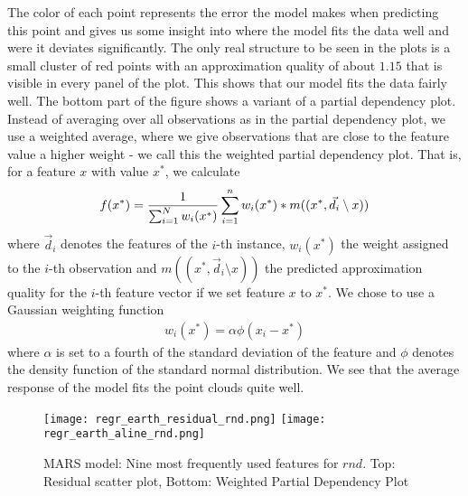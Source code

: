 \documentclass{article}
\begin{document}
The color of each point represents the error the model makes when
predicting this point and gives us some insight into where the model
fits the data well and were it deviates significantly. The only real
structure to be seen in the plots is a small cluster of red points with an
approximation quality of about $1.15$ that is visible in every panel
of the plot. This shows that our model fits the data fairly well. The
bottom part of the figure shows a variant of a partial dependency
plot. Instead of averaging over all observations as in the partial
dependency plot, we use a weighted average, where we give observations
that are close to the feature value a higher weight - we call this the
weighted partial dependency plot. That is, for a feature $x$ with
value $x^*$, we calculate
\begin{displaymath}
  f(x^*) = \frac{1}{\sum_{i=1}^N w_i(x^*)}
  \sum_{i=1}^n w_i(x^*) * m((x^*, \vec d_i \setminus x)) \\
\end{displaymath}
where $\vec d_i$ denotes the features of the $i$-th instance,
$w_i(x^*)$ the weight assigned to the $i$-th observation and $m((x^*,
\vec d_i \setminus x))$ the predicted approximation quality for the
$i$-th feature vector if we set feature $x$ to $x^*$. We chose to use a
Gaussian weighting function
\begin{align*}
  w_i(x^*) = \alpha \phi(x_i - x^*)
\end{align*}
where $\alpha$ is set to a fourth of the standard deviation of the
feature and $\phi$ denotes the density function of the standard normal distribution. We see that the average response of the model fits the point
clouds quite well.

\begin{figure}
  \centering
  \texttt{[image: regr\_earth\_residual\_rnd.png]}\vspace*{0.2cm}
  \texttt{[image: regr\_earth\_aline\_rnd.png]}
  \caption{MARS model: Nine most frequently used features for
    $rnd$. Top: Residual scatter plot, Bottom: Weighted Partial
    Dependency Plot}
  \label{fig:MARS}
\end{figure}
\end{document}
